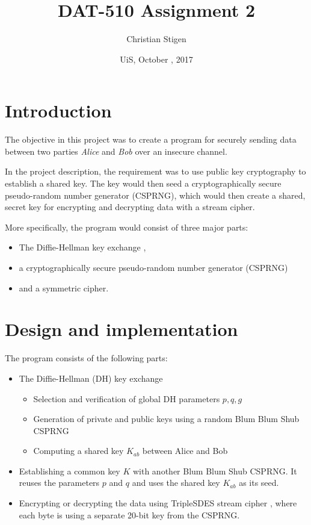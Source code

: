 \documentclass[a4paper,english,12pt]{article}
\title{DAT-510 Assignment 2}
\author{Christian Stigen}
\date{UiS, October \nth{9}, 2017}
\begin{document}
\maketitle

\begin{abstract}
\end{abstract}

\section{Introduction}
The objective in this project was to create a program for securely sending data
between two parties \textit{Alice} and \textit{Bob} over an insecure channel.

In the project description, the requirement was to use public key cryptography
to establish a shared key. The key would then seed a cryptographically secure
pseudo-random number generator (CSPRNG), which would then create a shared,
secret key for encrypting and decrypting data with a stream cipher.

More specifically, the program would consist of three major parts:
\begin{itemize}
  \item The Diffie-Hellman key exchange \cite{dh},
  \item a cryptographically secure pseudo-random number generator (CSPRNG)
  \item and a symmetric cipher.
\end{itemize}

\section{Design and implementation}
The program consists of the following parts:
\begin{itemize}
  \item The Diffie-Hellman \cite{dh} (DH) key exchange
    \begin{itemize}
      \item Selection and verification of global DH parameters $p, q, g$
      \item Generation of private and public keys using a random Blum Blum Shub CSPRNG
      \item Computing a shared key $K_{ab}$ between Alice and Bob
    \end{itemize}
  \item Establishing a common key $K$ with another Blum Blum Shub CSPRNG. It
    reuses the parameters $p$ and $q$ and uses the shared key $K_{ab}$ as its
    seed.
  \item Encrypting or decrypting the data using TripleSDES stream cipher
    \cite{sdes}, where each byte is using a separate 20-bit key from the
    CSPRNG.
\end{itemize}
\end{document}
